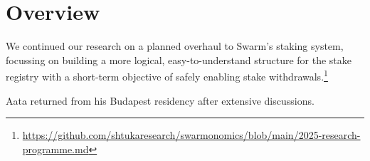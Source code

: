 \maketitle
\section*{Overview}

We continued our research on a planned overhaul to Swarm's staking system, focussing on building a more logical, easy-to-understand structure for the stake registry with a short-term objective of safely enabling stake withdrawals.\footnote{\url{https://github.com/shtukaresearch/swarmonomics/blob/main/2025-research-programme.md}}

Aata returned from his Budapest residency after extensive discussions.

